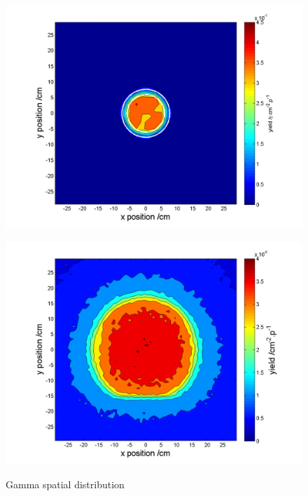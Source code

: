 \documentclass[11pt,a4paper]{IEEEtran}
\let\MYoriglatexcaption\caption
\renewcommand{\caption}[2][\relax]{\MYoriglatexcaption[#2]{#2}}
\begin{document}
\begin{figure}[t]
    \begin{minipage}{\columnwidth}
        \includegraphics[width=\columnwidth]{SUP10ColSpatialDistributionAllG.png}
        \label{fig:GammaSpatialDistributionSUP}
    \end{minipage}
    \begin{minipage}{\columnwidth}
        \includegraphics[width=\columnwidth]{CUP10ColSpatialDistributionAllG.png}
        \label{fig:GammaSpatialDistributionCUP}
    \end{minipage}
    \caption{Gamma spatial distribution}
    \label{fig:GammaSpatialDistribution}
\end{figure}
\end{document}
